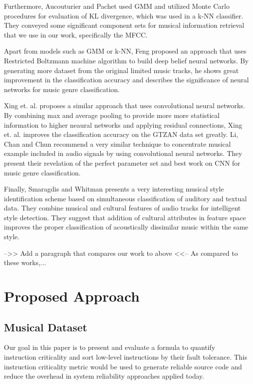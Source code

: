 Furthermore, Aucouturier and Pachet \cite{Pachet:2003} used GMM and utilized Monte Carlo procedures for evaluation of KL divergence, which was used in a k-NN classifier. They conveyed some significant component sets for musical information retrieval that we use in our work, specifically the MFCC. 

Apart from models such as GMM or k-NN, Feng \cite{Feng:2016} proposed an approach that uses Restricted Boltzmann machine algorithm to build deep belief neural networks. By generating more dataset from the original limited music tracks, he shows great improvement in the classification accuracy and describes the significance of neural networks for music genre classification. 

Xing et. al. \cite{Xing:2016} proposes a similar approach that uses convolutional neural networks. By combining max and average pooling to provide more more statistical information to higher neaural networks and applying residual connections, Xing et. al. \cite{Xing:2016} improves the classification accuracy on the GTZAN data set greatly. Li, Chan and Chun \cite{Chun:2010} recommend a very similar technique to concentrate musical example included in audio signals by using convolutional neural networks. They present their revelation of the perfect parameter set and best work on CNN for music genre classification.

Finally, Smaragdis and Whitman \cite{Smaragdis:2002} presents a very interesting musical style identification scheme based on simultaneous classification of auditory and textual data. They combine musical and cultural features of audio tracks for intelligent style detection. They suggest that addition of cultural attributes in feature space improves the proper classification of acoustically dissimilar music within the same style.

-->> Add a paragraph that compares our work to above <<-- 
As compared to these works,...

\section{Proposed Approach}\label{sec:approach}
\subsection{Musical Dataset}

Our goal in this paper is to present and evaluate a formula to quantify instruction criticality and sort low-level instructions by their fault tolerance. This instruction criticality metric would be used to generate reliable source code and reduce the overhead in system reliability approaches applied today. 

